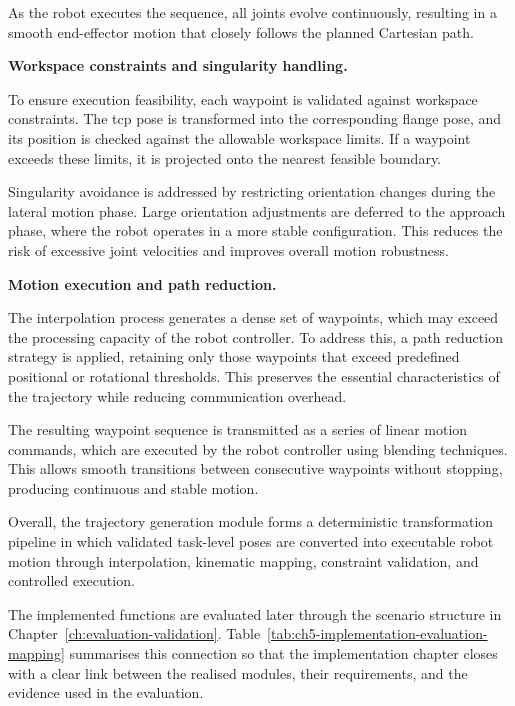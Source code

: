 As the robot executes the sequence, all joints evolve continuously, resulting in a smooth end-effector motion that closely follows the planned Cartesian path.

\label{sec:workspace-constraints-singularity-handling}
\noindent\textbf{Workspace constraints and singularity handling.}

To ensure execution feasibility, each waypoint is validated against workspace constraints. The \ac{tcp} pose is transformed into the corresponding flange pose, and its position is checked against the allowable workspace limits. If a waypoint exceeds these limits, it is projected onto the nearest feasible boundary.

Singularity avoidance is addressed by restricting orientation changes during the lateral motion phase. Large orientation adjustments are deferred to the approach phase, where the robot operates in a more stable configuration. This reduces the risk of excessive joint velocities and improves overall motion robustness.

\label{sec:motion-execution-path-reduction}
\noindent\textbf{Motion execution and path reduction.}

The interpolation process generates a dense set of waypoints, which may exceed the processing capacity of the robot controller. To address this, a path reduction strategy is applied, retaining only those waypoints that exceed predefined positional or rotational thresholds. This preserves the essential characteristics of the trajectory while reducing communication overhead.

The resulting waypoint sequence is transmitted as a series of linear motion commands, which are executed by the robot controller using blending techniques. This allows smooth transitions between consecutive waypoints without stopping, producing continuous and stable motion.

Overall, the trajectory generation module forms a deterministic transformation pipeline in which validated task-level poses are converted into executable robot motion through interpolation, kinematic mapping, constraint validation, and controlled execution.


The implemented functions are evaluated later through the scenario structure in Chapter~\ref{ch:evaluation-validation}. Table~\ref{tab:ch5-implementation-evaluation-mapping} summarises this connection so that the implementation chapter closes with a clear link between the realised modules, their requirements, and the evidence used in the evaluation.

